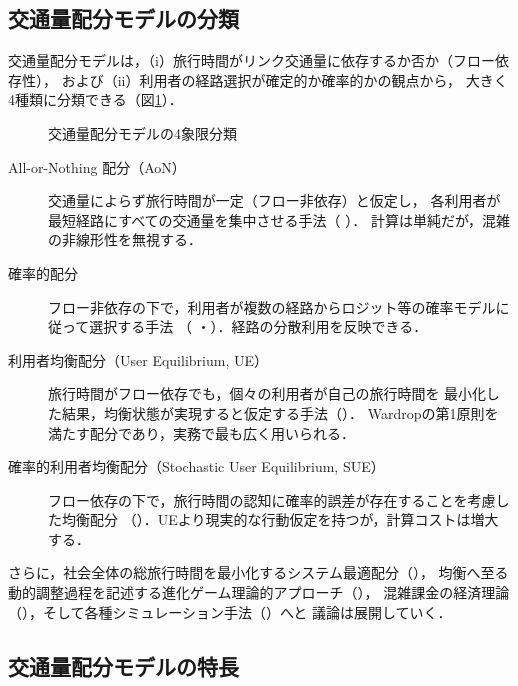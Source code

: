 \subsection*{交通量配分モデルの分類}

交通量配分モデルは，（i）旅行時間がリンク交通量に依存するか否か（フロー依存性），
および（ii）利用者の経路選択が確定的か確率的かの観点から，
大きく4種類に分類できる（図\ref{fig:model_overview}）\cite{土木学会1998,Sheffi1985}．

\begin{figure}[tb]
  \centering
  
  \caption{交通量配分モデルの4象限分類}
  \label{fig:model_overview}
\end{figure}

\begin{description}
  \item[All-or-Nothing 配分（AoN）]
    交通量によらず旅行時間が一定（フロー非依存）と仮定し，
    各利用者が最短経路にすべての交通量を集中させる手法（ ）．
    計算は単純だが，混雑の非線形性を無視する．
  \item[確率的配分]
    フロー非依存の下で，利用者が複数の経路からロジット等の確率モデルに従って選択する手法
    （ ・）．経路の分散利用を反映できる．
  \item[利用者均衡配分（User Equilibrium, UE）]
    旅行時間がフロー依存でも，個々の利用者が自己の旅行時間を
    最小化した結果，均衡状態が実現すると仮定する手法（）．
    Wardropの第1原則を満たす配分であり，実務で最も広く用いられる\cite{Wardrop1952}．
  \item[確率的利用者均衡配分（Stochastic User Equilibrium, SUE）]
    フロー依存の下で，旅行時間の認知に確率的誤差が存在することを考慮した均衡配分
    （）．UEより現実的な行動仮定を持つが，計算コストは増大する\cite{Daganzo1977}．
\end{description}

さらに，社会全体の総旅行時間を最小化するシステム最適配分（），
均衡へ至る動的調整過程を記述する進化ゲーム理論的アプローチ（），
混雑課金の経済理論（），そして各種シミュレーション手法（）へと
議論は展開していく．

\subsection*{交通量配分モデルの特長}

